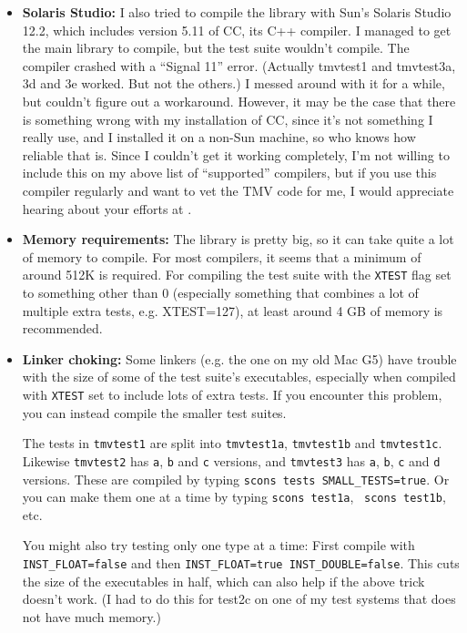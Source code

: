 \begin{itemize}
\item {\bf Solaris Studio:}
I also tried to compile the library with Sun's Solaris Studio 12.2, which includes
version 5.11 of CC, its C++ compiler.
I managed to get the main library to compile, but the test suite wouldn't compile.
The compiler crashed with a ``Signal 11'' error.  
(Actually tmvtest1 and tmvtest3a, 3d and 3e worked.  But not the others.)
I messed around with it for a 
while, but couldn't figure out a workaround.  However, it may be the case that 
there is something wrong with my installation of CC, since it's not something
I really use, and I installed it on a non-Sun machine, so who knows how reliable 
that is.  Since I couldn't get it working completely,
I'm not willing to include this on my above list of ``supported'' compilers,
but if you use this compiler regularly and want to vet the TMV code for me, I would 
appreciate hearing about your efforts at  \mygroup.

\item {\bf Memory requirements:}
The library is pretty big, so it can take quite a lot of memory to compile. 
For most compilers, it seems that a minimum of around 512K is required.
For compiling the test suite with the \texttt{XTEST} flag set to something other than 0 (especially something that combines a lot of multiple extra tests, e.g. XTEST=127), at least around 4 GB of memory is recommended.

\item {\bf Linker choking:}
Some linkers (e.g. the one on my old Mac G5) have trouble with the size 
of some of the test suite's executables, especially when compiled 
with \texttt{XTEST} set to include lots of extra tests.  If you encounter this problem, you can instead
compile the smaller test suites.  

The tests
in \texttt{tmvtest1} are split into \texttt{tmvtest1a}, \texttt{tmvtest1b} and \texttt{tmvtest1c}.
Likewise \texttt{tmvtest2} has \texttt{a}, \texttt{b} and \texttt{c} versions, and \texttt{tmvtest3}
has \texttt{a}, \texttt{b}, \texttt{c} and \texttt{d} versions.  These are 
compiled by typing \texttt{scons tests SMALL\_TESTS=true}.  Or you can make them one
at a time by typing \texttt{scons test1a},~ \texttt{scons test1b}, etc.

You might also try testing only one type at a time: First compile with \texttt{INST\_FLOAT=false}
and then \texttt{INST\_FLOAT=true INST\_DOUBLE=false}.  This cuts the size of the executables
in half, which can also help if the above trick doesn't work.  (I had to do this for test2c on one 
of my test systems that does not have much memory.)


\end{itemize}
